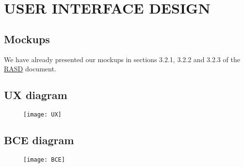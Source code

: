 \section{USER  INTERFACE  DESIGN}  
\subsection{Mockups}
We have already presented our mockups in sections 3.2.1, 3.2.2 and 3.2.3 of the \href{https://github.com/isiagosti/SoftEng2_PowerEnJoy/blob/master/Releases/RASD.pdf}{RASD} document.
\subsection{UX diagram}
\begin{figure}[H]
		\centering
		\texttt{[image: UX]}
	\end{figure}
\subsection{BCE diagram}
\begin{figure}[H]
	\centering
	\texttt{[image: BCE]}
\end{figure}